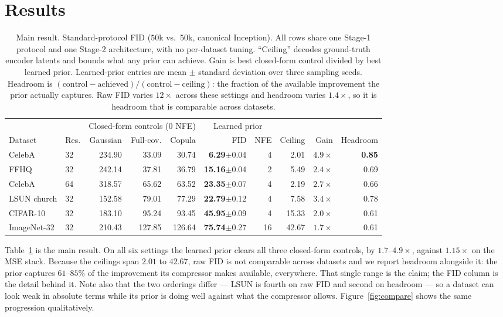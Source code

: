 \documentclass[sigconf,nonacm]{acmart}
\newcommand{\best}[1]{\textbf{#1}}
\newcommand{\std}[1]{{\scriptsize$\pm$#1}}
\begin{document}
\section{Results}
\label{sec:results}

\begin{table}[t]
\caption{Main result. Standard-protocol FID ($50$k vs.\ $50$k, canonical
Inception). All rows share one Stage-1 protocol and one Stage-2
architecture, with no per-dataset tuning. ``Ceiling'' decodes ground-truth
encoder latents and bounds what any prior can achieve. Gain is best
closed-form control divided by best learned prior. Learned-prior entries are
mean $\pm$ standard deviation over three sampling seeds. Headroom is
$(\text{control} - \text{achieved}) / (\text{control} - \text{ceiling})$: the
fraction of the available improvement the prior actually captures. Raw FID
varies $12\times$ across these settings and headroom varies $1.4\times$, so it
is headroom that is comparable across datasets.}
\label{tab:main}
\begin{tabular}{llrrrrrrrr}
\toprule
& & \multicolumn{3}{c}{Closed-form controls (0 NFE)} & \multicolumn{2}{c}{Learned prior} & & \\
\cmidrule(lr){3-5}\cmidrule(lr){6-7}
Dataset & Res. & Gaussian & Full-cov. & Copula & FID & NFE & Ceiling & Gain & Headroom \\
\midrule
CelebA      & 32 & 234.90 & 33.09  & 30.74  & \best{6.29}\std{0.04}  & 4  & 2.01  & $4.9\times$ & \best{0.85} \\
FFHQ        & 32 & 242.14 & 37.81  & 36.79  & \best{15.16}\std{0.04} & 2  & 5.49  & $2.4\times$ & 0.69 \\
CelebA      & 64 & 318.57 & 65.62  & 63.52  & \best{23.35}\std{0.07} & 4  & 2.19  & $2.7\times$ & 0.66 \\
LSUN church & 32 & 152.58 & 79.01  & 77.29  & \best{22.79}\std{0.12} & 4  & 7.58  & $3.4\times$ & 0.78 \\
CIFAR-10    & 32 & 183.10 & 95.24  & 93.45  & \best{45.95}\std{0.09} & 4  & 15.33 & $2.0\times$ & 0.61 \\
ImageNet-32 & 32 & 210.43 & 127.85 & 126.64 & \best{75.74}\std{0.27} & 16 & 42.67 & $1.7\times$ & 0.61 \\
\bottomrule
\end{tabular}
\end{table}

Table~\ref{tab:main} is the main result. On all six settings the learned prior
clears all three closed-form controls, by $1.7$--$4.9\times$, against
$1.15\times$ on the MSE stack. Because the ceilings span $2.01$ to $42.67$, raw FID is not comparable
across datasets and we report headroom alongside it: the prior captures
$61$--$85\%$ of the improvement its compressor makes available, everywhere. That
single range is the claim; the FID column is the detail behind it. Note also
that the two orderings differ --- LSUN is fourth on raw FID and second on
headroom --- so a dataset can look weak in absolute terms while its prior is
doing well against what the compressor allows. Figure~\ref{fig:compare} shows the same progression qualitatively.
\end{document}
